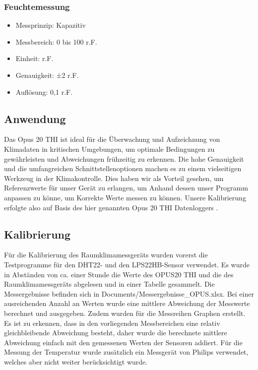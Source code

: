 \subsubsection{Feuchtemessung}

\begin{itemize}
    \item Messprinzip: Kapazitiv
    \item Messbereich: 0 bis 100 r.F.
    \item Einheit: r.F.
    \item Genauigkeit: ±2 r.F.
    \item Auflösung: 0,1 r.F.  \cite{Lufft:2018}
\end{itemize}

\subsection{Anwendung}

Das Opus 20 THI ist ideal für die Überwachung und Aufzeichnung von Klimadaten in kritischen Umgebungen, um optimale Bedingungen zu gewährleisten und Abweichungen frühzeitig zu erkennen. Die hohe Genauigkeit und die umfangreichen Schnittstellenoptionen machen es zu einem vielseitigen Werkzeug in der Klimakontrolle. Dies haben wir als Vorteil gesehen, um Referenzwerte für unser Gerät zu erlangen, um Anhand dessen unser Programm anpassen zu könne, um Korrekte Werte messen zu können. Unsere Kalibrierung erfolgte also auf Basis des hier genannten Opus 20 THI Datenloggers \cite{Daten:2024}.

\subsection{Kalibrierung}

Für die Kalibrierung des Raumklimamessgeräts wurden vorerst die Testprogramme für den DHT22- und den LPS22HB-Sensor verwendet. Es wurde in Abständen von ca. einer Stunde die Werte des OPUS20 THI und die des Raumklimamessgeräts abgelesen und in einer Tabelle gesammelt. Die Messergebnisse befinden sich in Documents/Messergebnisse\_OPUS.xlsx. Bei einer ausreichenden Anzahl an Werten wurde eine mittlere Abweichung der Messwerte berechnet und ausgegeben. Zudem wurden für die Messreihen Graphen erstellt. Es ist zu erkennen, dass in den vorliegenden Messbereichen eine relativ gleichbleibende Abweichung besteht, daher wurde die berechnete mittlere Abweichung einfach mit den gemessenen Werten der Sensoren addiert. Für die Messung der Temperatur wurde zusätzlich ein Messgerät von Philips verwendet, welches aber nicht weiter berücksichtigt wurde.

